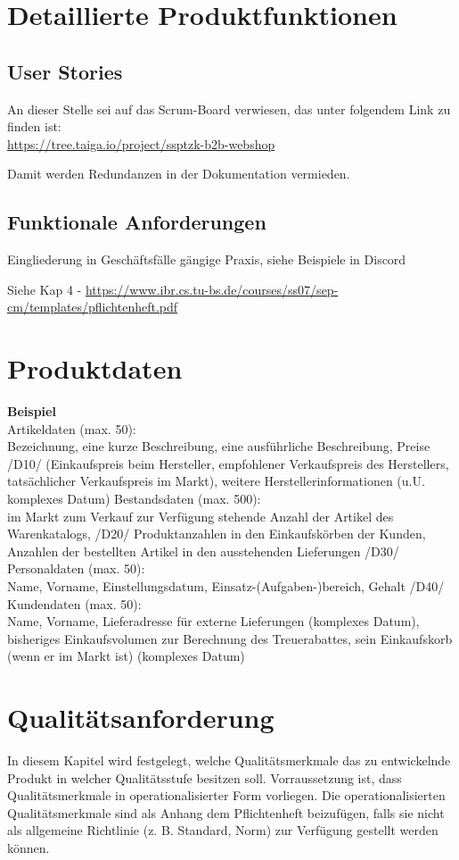 \documentclass[%
	12pt,
	a4paper,
	oneside,
	parskip=full
]{scrbook}
\begin{document}
\chapter{Detaillierte Produktfunktionen}


\section{User Stories}
An dieser Stelle sei auf das Scrum-Board verwiesen, das unter folgendem Link zu finden ist: \\
\url{https://tree.taiga.io/project/ssptzk-b2b-webshop}

Damit werden Redundanzen in der Dokumentation vermieden.

\section{Funktionale Anforderungen}
Eingliederung in Geschäftsfälle gängige Praxis, siehe Beispiele in Discord

Siehe Kap 4 - \url{https://www.ibr.cs.tu-bs.de/courses/ss07/sep-cm/templates/pflichtenheft.pdf}


\chapter{Produktdaten}
\textbf{Beispiel} \\
Artikeldaten (max. 50):\\
Bezeichnung, eine kurze Beschreibung, eine ausführliche Beschreibung, Preise
/D10/
(Einkaufspreis beim Hersteller, empfohlener Verkaufspreis des Herstellers,
tatsächlicher Verkaufspreis im Markt), weitere Herstellerinformationen (u.U.
komplexes Datum)
Bestandsdaten (max. 500):\\
im Markt zum Verkauf zur Verfügung stehende Anzahl der Artikel des Warenkatalogs,
/D20/
Produktanzahlen in den Einkaufskörben der Kunden, Anzahlen der bestellten Artikel in
den ausstehenden Lieferungen
/D30/ Personaldaten (max. 50):\\
Name, Vorname, Einstellungsdatum, Einsatz-(Aufgaben-)bereich, Gehalt
/D40/ Kundendaten (max. 50):\\
Name, Vorname, Lieferadresse für externe Lieferungen (komplexes Datum), bisheriges
Einkaufsvolumen zur Berechnung des Treuerabattes, sein Einkaufskorb (wenn er im
Markt ist) (komplexes Datum)

\chapter{Qualitätsanforderung}
In diesem Kapitel wird festgelegt, welche Qualitätsmerkmale das zu entwickelnde Produkt in
welcher Qualitätsstufe besitzen soll. Vorraussetzung ist, dass Qualitätsmerkmale in
operationalisierter Form vorliegen. Die operationalisierten Qualitätsmerkmale sind als
Anhang dem Pflichtenheft beizufügen, falls sie nicht als allgemeine Richtlinie (z. B. Standard,
Norm) zur Verfügung gestellt werden können.
\end{document}
